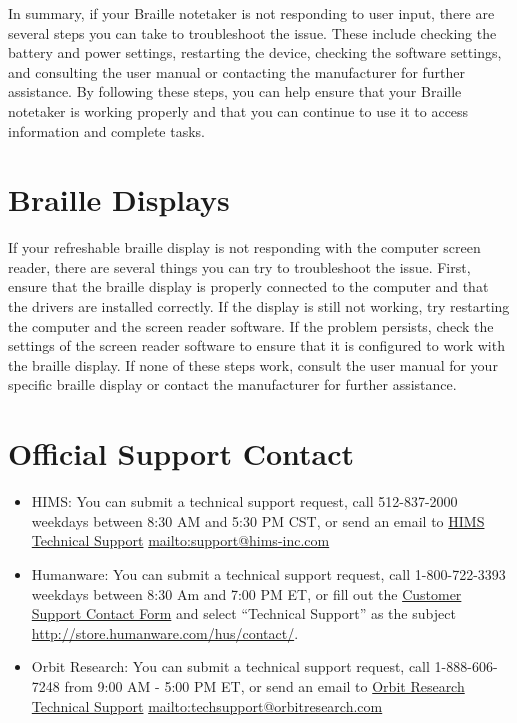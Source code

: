 \documentclass[12pt,letterpaper,twoside,openright]{report}
\begin{document}
\begin{appendices}
In summary, if your Braille notetaker is not responding to user input, there are several steps you can take to troubleshoot the issue. These include checking the battery and power settings, restarting the device, checking the software settings, and consulting the user manual or contacting the manufacturer for further assistance. By following these steps, you can help ensure that your Braille notetaker is working properly and that you can continue to use it to access information and complete tasks.  
\hypertarget{display2}{}\section{Braille Displays}\label{display2}
If your refreshable braille display is not responding with the computer screen reader, there are several things you can try to troubleshoot the issue. First, ensure that the braille display is properly connected to the computer and that the drivers are installed correctly. If the display is still not working, try restarting the computer and the screen reader software. If the problem persists, check the settings of the screen reader software to ensure that it is configured to work with the braille display. If none of these steps work, consult the user manual for your specific braille display or contact the manufacturer for further assistance.
\hypertarget{report2}{}\section{Official Support Contact}\label{report2}
\begin{itemize}[leftmargin=*]
\item HIMS: You can submit a technical support request, call 512-837-2000 weekdays between 8:30 AM and 5:30 PM CST, or send an email to \href{mailto:support@hims-inc.com}{HIMS Technical Support}  \break\url{mailto:support@hims-inc.com}
\item Humanware: You can submit a technical support request, call 1-800-722-3393 weekdays between 8:30 Am and 7:00 PM ET, or fill out the \href{http://store.humanware.com/hus/contact/}{Customer Support Contact Form} and select ``Technical Support'' as the subject \break\url{http://store.humanware.com/hus/contact/}. 
\item Orbit Research: You can submit a technical support request, call 1-888-606-7248 from 9:00 AM - 5:00 PM ET, or send an email to \href{mailto:techsupport@orbitresearch.com}{Orbit Research Technical Support}  \break\url{mailto:techsupport@orbitresearch.com}

\end{itemize}
\end{appendices}
\end{document}
